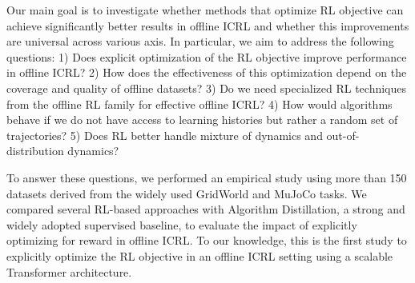 \documentclass{article} %
\begin{document}
Our main goal is to investigate whether methods that optimize RL objective can achieve significantly better results in offline ICRL and whether this improvements are universal across various axis. In particular, we aim to address the following questions: 1) Does explicit optimization of the RL objective improve performance in offline ICRL?
2) How does the effectiveness of this optimization depend on the coverage and quality of offline datasets? 
3) Do we need specialized RL techniques from the offline RL family for effective offline ICRL?
4) How would algorithms behave if we do not have access to learning histories but rather a random set of trajectories?
5) Does RL better handle mixture of dynamics and out-of-distribution dynamics?

To answer these questions, we performed an empirical study using more than 150 datasets derived from the widely used GridWorld and MuJoCo \citep{todorov2012mujoco} tasks. We compared several RL-based approaches with Algorithm Distillation, a strong and widely adopted supervised baseline, to evaluate the impact of explicitly optimizing for reward in offline ICRL. To our knowledge, this is the first study to explicitly optimize the RL objective in an offline ICRL setting using a scalable Transformer architecture.


\end{document}
